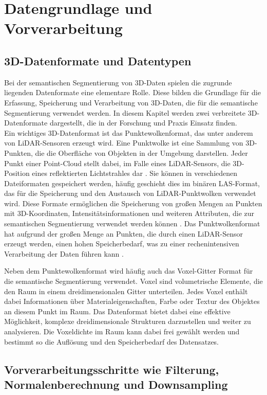 \chapter{Datengrundlage und Vorverarbeitung}
\section{3D-Datenformate und Datentypen}
Bei der semantischen Segmentierung von 3D-Daten spielen die zugrunde liegenden
Datenformate eine elementare Rolle. Diese bilden die Grundlage für die
Erfassung, Speicherung und Verarbeitung von 3D-Daten, die für die semantische
Segmentierung verwendet werden. In diesem Kapitel werden zwei verbreitete
3D-Datenformate dargestellt, die in der Forschung und Praxis Einsatz finden.
\\Ein wichtiges 3D-Datenformat ist das Punktewolkenformat, das unter anderem
von LiDAR-Sensoren erzeugt wird. Eine Punktwolke ist eine Sammlung von
3D-Punkten, die die Oberfläche von Objekten in der Umgebung darstellen. Jeder
Punkt einer Point-Cloud stellt dabei, im Falle eines LiDAR-Sensors, die
3D-Position eines reflektierten Lichtstrahles dar \cite{20222324}. Sie können
in verschiedenen Dateiformaten gespeichert werden, häufig geschieht dies im
binären LAS-Format, das für die Speicherung und den Austausch von
LiDAR-Punktwolken verwendet wird. Diese Formate ermöglichen die Speicherung von
großen Mengen an Punkten mit 3D-Koordinaten, Intensitätsinformationen und
weiteren Attributen, die zur semantischen Segmentierung verwendet werden können
\cite{elphcik1991using}. Das Punktwolkenformat hat aufgrund der großen Menge an
Punkten, die durch einen LiDAR-Sensor erzeugt werden, einen hohen
Speicherbedarf, was zu einer rechenintensiven Verarbeitung der Daten führen
kann \cite{8578570}.

Neben dem Punktewolkenformat wird häufig auch das Voxel-Gitter Format für die
semantische Segmentierung verwendet. Voxel sind volumetrische Elemente, die den
Raum in einem dreidimensionalen Gitter unterteilen. Jedes Voxel enthält dabei
Informationen über Materialeigenschaften, Farbe oder Textur des Objektes an
diesem Punkt im Raum. Das Datenformat bietet dabei eine effektive Möglichkeit,
komplexe dreidimensionale Strukturen darzustellen und weiter zu analysieren.
Die Voxeldichte im Raum kann dabei frei gewählt werden und bestimmt so die
Auflösung und den Speicherbedarf des
Datensatzes.\cite{niessner2013real,6706719}

\section{Vorverarbeitungsschritte wie Filterung, Normalenberechnung und Downsampling}

